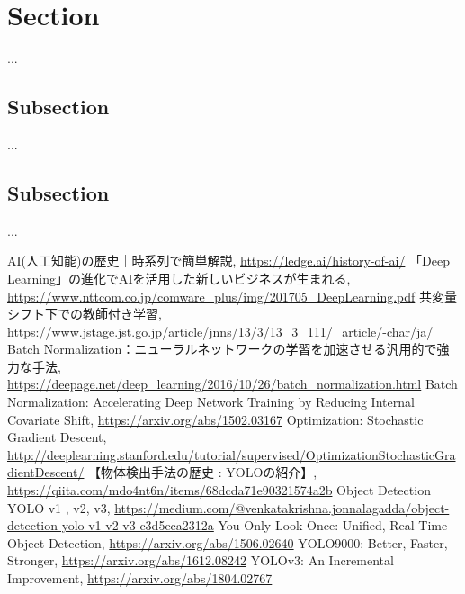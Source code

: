 \documentclass[11pt,a4paper]{jsarticle}
\begin{document}
\section{Section}
...

\subsection{Subsection}
...

\subsection{Subsection}
...


\begin{thebibliography}{9}
	 AI(人工知能)の歴史｜時系列で簡単解説, \url{https://ledge.ai/history-of-ai/}
	 「Deep Learning」の進化でAIを活用した新しいビジネスが生まれる, \url{https://www.nttcom.co.jp/comware_plus/img/201705_DeepLearning.pdf}
	 共変量シフト下での教師付き学習, \url{https://www.jstage.jst.go.jp/article/jnns/13/3/13_3_111/_article/-char/ja/}
	 Batch Normalization：ニューラルネットワークの学習を加速させる汎用的で強力な手法, \url{https://deepage.net/deep_learning/2016/10/26/batch_normalization.html}
	 Batch Normalization: Accelerating Deep Network Training by Reducing Internal Covariate Shift, \url{https://arxiv.org/abs/1502.03167}
	 Optimization: Stochastic Gradient Descent, \url{http://deeplearning.stanford.edu/tutorial/supervised/OptimizationStochasticGradientDescent/}
	 【物体検出手法の歴史 : YOLOの紹介】, \url{https://qiita.com/mdo4nt6n/items/68dcda71e90321574a2b}
	 Object Detection YOLO v1 , v2, v3, \url{https://medium.com/@venkatakrishna.jonnalagadda/object-detection-yolo-v1-v2-v3-c3d5eca2312a}
	 You Only Look Once: Unified, Real-Time Object Detection, \url{https://arxiv.org/abs/1506.02640}
	 YOLO9000: Better, Faster, Stronger, \url{https://arxiv.org/abs/1612.08242}
	 YOLOv3: An Incremental Improvement, \url{https://arxiv.org/abs/1804.02767}
\end{thebibliography}

%
%
\end{document}

